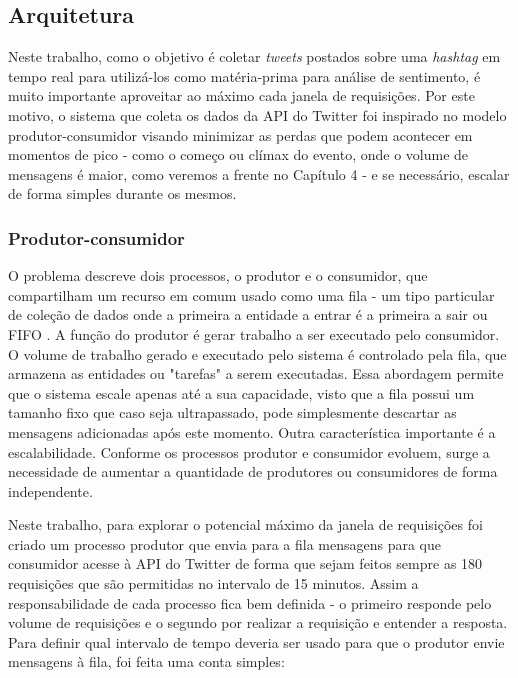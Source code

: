 \subsection{Arquitetura}

Neste trabalho, como o objetivo é coletar \textit{tweets} postados sobre uma \textit{hashtag} em tempo real para utilizá-los como matéria-prima para análise de sentimento, é muito importante aproveitar ao máximo cada janela de requisições. Por este motivo, o sistema que coleta os dados da API do Twitter foi inspirado no modelo produtor-consumidor\cite{jeffay1993real} visando minimizar as perdas que podem acontecer em momentos de pico - como o começo ou clímax do evento, onde o volume de mensagens é maior, como veremos a frente no Capítulo 4 - e se necessário, escalar de forma simples durante os mesmos. 

\subsubsection{Produtor-consumidor}

O problema descreve dois processos, o produtor e o consumidor, que compartilham um recurso em comum usado como uma fila - um tipo particular de coleção de dados onde a primeira a entidade a entrar é a primeira a sair ou \ac{FIFO} . A função do produtor é gerar trabalho a ser executado pelo consumidor. O volume de trabalho gerado e executado pelo sistema é controlado pela fila, que armazena as entidades ou "tarefas" a serem executadas. Essa abordagem permite que o sistema escale apenas até a sua capacidade, visto que a fila possui um tamanho fixo que caso seja ultrapassado, pode simplesmente descartar as mensagens adicionadas após este momento. Outra característica importante é a escalabilidade. Conforme os processos produtor e consumidor evoluem, surge a necessidade de aumentar a quantidade de produtores ou consumidores de forma independente.

Neste trabalho, para explorar o potencial máximo da janela de requisições foi criado um processo produtor que envia para a fila mensagens para que consumidor acesse à API do Twitter de forma que sejam feitos sempre as 180 requisições que são permitidas no intervalo de 15 minutos. Assim a responsabilidade de cada processo fica bem definida - o primeiro responde pelo volume de requisições e o segundo por realizar a requisição e entender a resposta. Para definir qual intervalo de tempo deveria ser usado para que o produtor envie mensagens à fila, foi feita uma conta simples:

